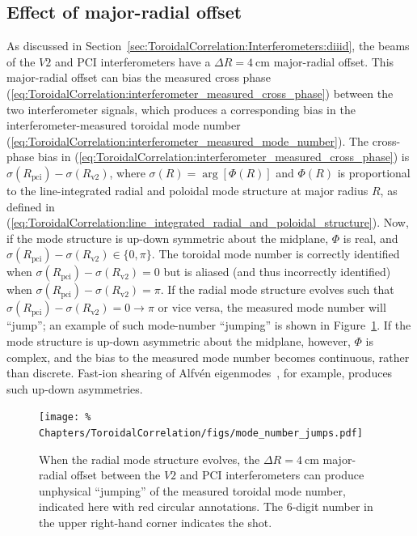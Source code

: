 \subsection{Effect of major-radial offset}
\label{sec:ToroidalCorrelation:ImplementationDetails:radial_offset}
As discussed in Section~\ref{sec:ToroidalCorrelation:Interferometers:diiid},
the beams of the $V2$ and PCI interferometers have a
$\Delta R = \SI{4}{\centi\meter}$ major-radial offset.
This major-radial offset can bias the measured cross phase
(\ref{eq:ToroidalCorrelation:interferometer_measured_cross_phase})
between the two interferometer signals,
which produces a corresponding bias
in the interferometer-measured toroidal mode number
(\ref{eq:ToroidalCorrelation:interferometer_measured_mode_number}).
The cross-phase bias in
(\ref{eq:ToroidalCorrelation:interferometer_measured_cross_phase})
is $\sigma(R_{\text{pci}}) - \sigma(R_{\text{v2}})$, where
$\sigma(R) = \arg[\Phi(R)]$ and $\Phi(R)$ is proportional to
the line-integrated radial and poloidal mode structure
at major radius $R$, as defined in
(\ref{eq:ToroidalCorrelation:line_integrated_radial_and_poloidal_structure}).
Now, if the mode structure is up-down symmetric about the midplane,
$\Phi$ is real, and
$\sigma(R_{\text{pci}}) - \sigma(R_{\text{v2}}) \in \{0, \pi\}$.
The toroidal mode number is correctly identified
when $\sigma(R_{\text{pci}}) - \sigma(R_{\text{v2}}) = 0$ but
is aliased (and thus incorrectly identified)
when $\sigma(R_{\text{pci}}) - \sigma(R_{\text{v2}}) = \pi$.
If the radial mode structure evolves such that
$\sigma(R_{\text{pci}}) - \sigma(R_{\text{v2}}) = 0 \rightarrow \pi$
or vice versa,
the measured mode number will ``jump'';
an example of such mode-number ``jumping'' is shown in
Figure~\ref{fig:ToroidalCorrelation:mode_number_jumps}.
If the mode structure is up-down asymmetric about the midplane, however,
$\Phi$ is complex, and
the bias to the measured mode number becomes continuous, rather than discrete.
Fast-ion shearing of Alfv\'{e}n eigenmodes~\cite{tobias_prl11},
for example, produces such up-down asymmetries.

\begin{figure}
  \centering
  \texttt{[image: \%
    Chapters/ToroidalCorrelation/figs/mode\_number\_jumps.pdf]}
  \caption[Mode-number ``jumping'' due to major-radial offset of interferometers]{%
    When the radial mode structure evolves,
    the $\Delta R = \SI{4}{\centi\meter}$ major-radial offset
    between the $V2$ and PCI interferometers can produce
    unphysical ``jumping'' of the measured toroidal mode number,
    indicated here with red circular annotations.
    The $6$-digit number in the upper right-hand corner
    indicates the \diiid\space shot.
  }
\label{fig:ToroidalCorrelation:mode_number_jumps}
\end{figure}

